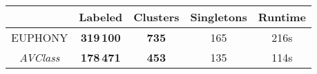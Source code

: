 \begin{tabular}{|c|c|c|c|c|}
    \hline
                        & \textbf{Labeled}  & \textbf{Clusters}   & Singletons & Runtime \\
    \hline
    EUPHONY             & \textbf{319\,100} & \textbf{735}        & 165        & 216s \\
    {\em AVClass}       & \textbf{178\,471} & \textbf{453}        & 135        & 114s \\
    \hline
\end{tabular}

